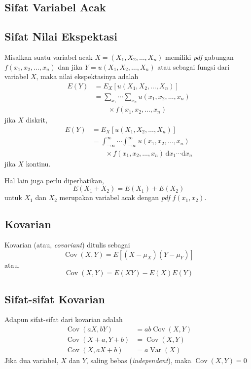 \documentclass[a4paper,extrafontsizes, 9pt]{memoir}
\DeclareMathOperator{\Cov}{Cov}
\DeclareMathOperator{\Var}{Var}
\begin{document}
\begin{multicols}{3}
		\section*{\small Sifat Variabel Acak}
			\subsection*{\small Sifat Nilai Ekspektasi}
				Misalkan suatu variabel acak $X = \left(X_{1}, X_{2}, \ldots, X_{n}\right)$ memiliki \textsl{pdf} gabungan $f(x_{1}, x_{2}, \ldots, x_{n})$ dan jika $Y = u\left(X_{1}, X_{2}, \ldots, X_{n}\right)$ atau sebagai fungsi dari variabel $X$, maka nilai ekspektasinya adalah
					\begin{align*}
						E(Y) & = E_{X}\left[u\left(X_{1}, X_{2}, \ldots, X_{n}\right)\right]\\
						& = \sum_{x_{1}}\cdots\sum_{x_{n}}u\left(x_{1}, x_{2}, \ldots, x_{n}\right)\\
						& \qquad \times f(x_{1}, x_{2}, \ldots, x_{n})
					\end{align*}
				jika $X$ diskrit,
					\begin{align*}
						E(Y) & = E_{X}\left[u\left(X_{1}, X_{2}, \ldots, X_{n}\right)\right]\\
						& = \int_{-\infty}^{\infty}\cdots\int_{-\infty}^{\infty}u\left(x_{1}, x_{2}, \ldots, x_{n}\right)\\
						& \qquad \times f(x_{1}, x_{2}, \ldots, x_{n})\,\mathrm{d}x_{1}\cdots\mathrm{d}x_{n}
					\end{align*}
				jika $X$ kontinu.
				
				Hal lain juga perlu diperhatikan,
					\[
						E\left(X_{1} + X_{2}\right) = E(X_{1}) + E(X_{2})
					\]
				untuk $X_{1}$ dan $X_{2}$ merupakan variabel acak dengan \textsl{pdf} $f\left(x_{1}, x_{2}\right)$.
			\subsection*{\small Kovarian}
				Kovarian (atau, \textsl{covariant}) ditulis sebagai
					\[
						\Cov(X, Y) = E\left[(X - \mu_{X})(Y - \mu_{Y})\right]
					\]
				atau,
					\[
						\Cov(X, Y) = E(XY) - E(X)E(Y)
					\]
					
			\subsection*{\small Sifat-sifat Kovarian}
				Adapun sifat-sifat dari kovarian adalah
					\begin{align*}
						\Cov(aX, bY) & = ab\Cov(X, Y)\\
						\Cov(X + a, Y + b) & = \Cov(X, Y)\\
						\Cov(X, aX + b) & = a\Var(X)
					\end{align*}
				Jika dua variabel, $X$ dan $Y$, saling bebas (\textsl{independent}), maka $\Cov(X, Y) = 0$
			

\end{multicols}
\end{document}
